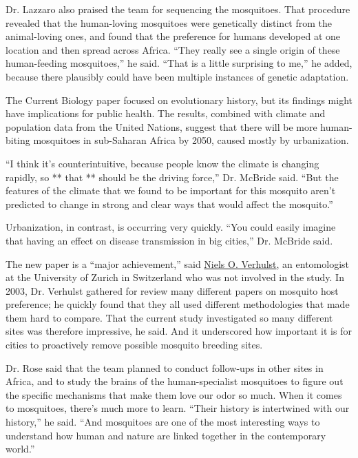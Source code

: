 Dr. Lazzaro also praised the team for sequencing the mosquitoes. That
procedure revealed that the human-loving mosquitoes were genetically
distinct from the animal-loving ones, and found that the preference for
humans developed at one location and then spread across Africa. ``They
really see a single origin of these human-feeding mosquitoes,'' he said.
``That is a little surprising to me,'' he added, because there plausibly
could have been multiple instances of genetic adaptation.

The Current Biology paper focused on evolutionary history, but its
findings might have implications for public health. The results,
combined with climate and population data from the United Nations,
suggest that there will be more human-biting mosquitoes in sub-Saharan
Africa by 2050, caused mostly by urbanization.

``I think it's counterintuitive, because people know the climate is
changing rapidly, so ** that ** should be the driving force,'' Dr.
McBride said. ``But the features of the climate that we found to be
important for this mosquito aren't predicted to change in strong and
clear ways that would affect the mosquito.''

Urbanization, in contrast, is occurring very quickly. ``You could easily
imagine that having an effect on disease transmission in big cities,''
Dr. McBride said.

The new paper is a ``major achievement,'' said
\href{https://www.paras.uzh.ch/dam/jcr:1b78cbda-d985-448d-b6c2-73a74083e7dd/Verhulst\%20Curriculum\%20vitae\%20UZH\%20website\%202018\%20(1).pdf}{Niels
O. Verhulst}, an entomologist at the University of Zurich in Switzerland
who was not involved in the study. In 2003, Dr. Verhulst gathered for
review many different papers on mosquito host preference; he quickly
found that they all used different methodologies that made them hard to
compare. That the current study investigated so many different sites was
therefore impressive, he said. And it underscored how important it is
for cities to proactively remove possible mosquito breeding sites.

Dr. Rose said that the team planned to conduct follow-ups in other sites
in Africa, and to study the brains of the human-specialist mosquitoes to
figure out the specific mechanisms that make them love our odor so much.
When it comes to mosquitoes, there's much more to learn. ``Their history
is intertwined with our history,'' he said. ``And mosquitoes are one of
the most interesting ways to understand how human and nature are linked
together in the contemporary world.''

